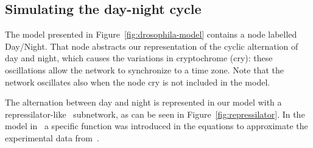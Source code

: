 \documentclass{bmcart}
\begin{document}
\subsection{Simulating the day-night cycle}\label{suppl:repressilator}
The model presented in Figure~\ref{fig:drosophila-model} contains a node
labelled {\sf Day/Night}. That node abstracts our representation
of the cyclic alternation of day and night, which causes the variations
in cryptochrome ({\sf cry}): these oscillations allow the network
to synchronize to a time zone. Note that the network oscillates
also when the node {\sf cry} is not included in the model.

The alternation between day and night is represented in our model with a
repressilator-like~\cite{repressilator} subnetwork, as can be seen in Figure~\ref{fig:repressilator}.
In the model in~\cite{drosophila-ode-model} a specific function
was introduced in the equations to approximate the experimental data from~\cite{drosophila-cry-data}.
\end{document}
